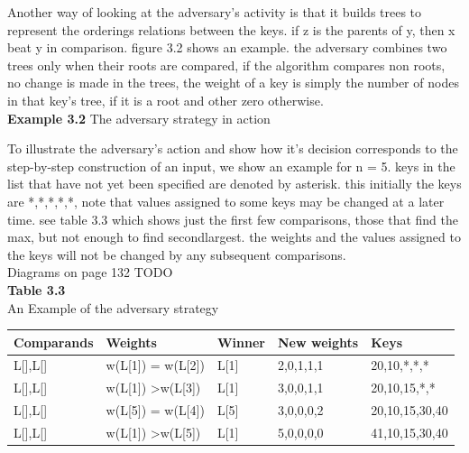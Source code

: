 \documentclass[a4paper,10pt,titlepage]{report}
\begin{document}
Another way of looking at the adversary's activity is that it builds trees to represent the orderings relations between the keys. if z is the parents of y, then x beat y in comparison. figure 3.2 shows an example. the adversary combines two trees only when their roots are compared, if the algorithm compares non roots, no change is made in the trees, the weight of a key is simply the number of nodes in that key's tree, if it is a root and other zero otherwise.\\
\vspace{5mm}
\textbf{Example 3.2} The adversary strategy in action

To illustrate the adversary's action and show how it's decision corresponds to the step-by-step construction of an input, we show an example for n = 5. keys in the list that have not yet been specified are denoted by asterisk. this initially the keys are *,*,*,*,*, note that values assigned to some keys may be changed at a later time. see table 3.3 which shows just the first few comparisons, those that find the max, but not enough to find secondlargest. the weights and the values assigned to the keys will not be changed by any subsequent comparisons.\\

Diagrams on page 132 TODO
\\
\textbf{Table 3.3}\\
An Example of the adversary strategy\\
\begin{tabular}{lllll}
\hline
Comparands & Weights & Winner & New weights & Keys \\ \hline
L{[}{]},L{[}{]} & w(L{[}1{]}) = w(L{[}2{]}) & L{[}1{]} & 2,0,1,1,1 & 20,10,*,*,* \\
L{[}{]},L{[}{]} & w(L{[}1{]}) \textgreater w(L{[}3{]}) & L{[}1{]} & 3,0,0,1,1 & 20,10,15,*,* \\
L{[}{]},L{[}{]} & w(L{[}5{]}) = w(L{[}4{]}) & L{[}5{]} & 3,0,0,0,2 & 20,10,15,30,40 \\
L{[}{]},L{[}{]} & w(L{[}1{]}) \textgreater w(L{[}5{]}) & L{[}1{]} & 5,0,0,0,0 & 41,10,15,30,40 \\ \hline
\end{tabular}
\vspace{5mm}
\end{document}
